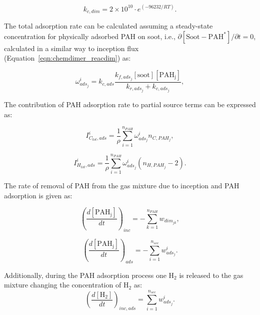 \begin{equation}
	k_{c,dim} = 2\times10^{10}\cdot e^{(-96232/RT)}
	\label{eqn:kcads_reacdim}.
\end{equation}


The total adsorption rate can be calculated assuming a steady-state concentration for physically adsorbed PAH on soot, i.e., ${\partial{[\mathrm{Soot-PAH^*}]}/\partial t = 0}$, calculated in a similar way to inception flux (Equation~\eqref{eqn:chemdimer_reacdim}) as:

\begin{equation}
	\omega^i_{ads_j} = k_{c,ads}\frac{k_{f,ads_j}[\mathrm{soot}][\mathrm{PAH_j}]}{k_{r,ads_j}+k_{c,ads_j}}
	\label{eqn:wads_reacdim},
\end{equation}

The contribution of PAH adsorption rate to partial source terms can be expressed as:

\begin{equation}
	I^i_{C_{tot},ads} =
	\frac{1}{\rho}
	\sum_{i=1}^{n_{PAH}}
	\omega^i_{ads_j}
	n_{C,PAH_j}
	\label{eqn:ICtotads_reacdim},
\end{equation}

\begin{equation}
	I^i_{H_{tot},ads} =
	\frac{1}{\rho}
	\sum_{i=1}^{n_{PAH}}
	\omega^i_{ads_j}
	\left(n_{H,PAH_j}-2\right)
	\label{eqn:IHtotads_reacdim}.
\end{equation}

The rate of removal of PAH from the gas mixture due to inception and PAH adsorption is given as:

\begin{equation}
	\left(
	\frac{d\left[{\mathrm{PAH_j}}\right]}{dt}
	\right)_{inc}
	= 
	-\sum_{k=1}^{n_{PAH}}w_{dim_{jk}},
	\label{eqn:PAHscrub_inc_reacdim}
\end{equation}

\begin{equation}
	\left(
	\frac{d\left[{\mathrm{PAH_j}}\right]}{dt}
	\right)_{ads}
	= -\sum_{i=1}^{n_{sec}}w^i_{ads_j}.
	\label{eqn:PAHscrub_ads_reacdim}
\end{equation}

Additionally, during the PAH adsorption process one $\mathrm{H_2}$ is released to the gas mixture changing the concentration of $\mathrm{H_2}$ as:
\begin{equation}
	\left(
		\frac{d\left[{\mathrm{H_2}}\right]}{dt}
	\right)_{inc, ads}
	= 
	\sum_{i=1}^{n_{sec}}w^i_{ads_j}
	\label{eqn:H2scrub_reacdim}.
\end{equation}

